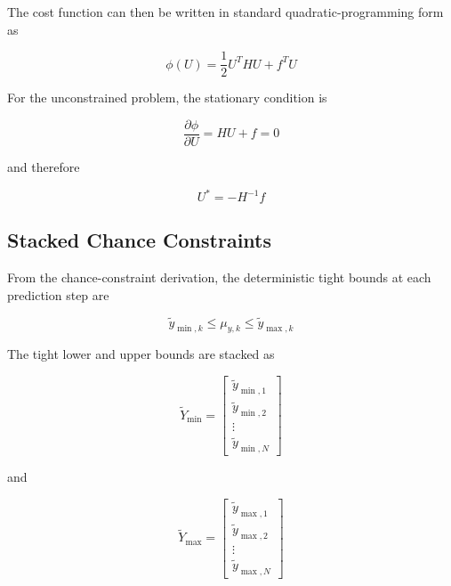 The cost function can then be written in standard quadratic-programming form as

\begin{equation}
    \boxed{
        \phi(U)
        =
        \frac{1}{2}U^THU
        +
        f^TU
    }
    \label{eq:stochastic_qp_cost}
\end{equation}


For the unconstrained problem, the stationary condition is

\begin{equation}
    \frac{\partial\phi}{\partial U}
    =
    HU+f
    =
    0
\end{equation}

and therefore

\begin{equation}
    U^\ast
    =
    -H^{-1}f
\end{equation}

\subsection{Stacked Chance Constraints}

From the chance-constraint derivation, the deterministic tight bounds at each prediction step are

\begin{equation}
    \tilde{y}_{\min,k}
    \leq
    \mu_{y,k}
    \leq
    \tilde{y}_{\max,k}
\end{equation}

The tight lower and upper bounds are stacked as

\begin{equation}
    \tilde{Y}_{\min}
    =
    \begin{bmatrix}
        \tilde{y}_{\min,1} \\
        \tilde{y}_{\min,2} \\
        \vdots \\
        \tilde{y}_{\min,N}
    \end{bmatrix}
\end{equation}

and

\begin{equation}
    \tilde{Y}_{\max}
    =
    \begin{bmatrix}
        \tilde{y}_{\max,1} \\
        \tilde{y}_{\max,2} \\
        \vdots \\
        \tilde{y}_{\max,N}
    \end{bmatrix}
\end{equation}

